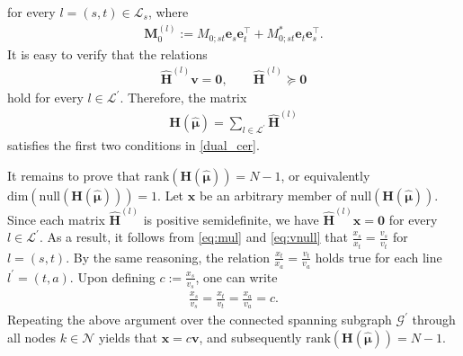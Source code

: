 \documentclass[journal,twoside]{IEEEtran}
\newcommand{\rank}{{\mathrm {rank}}}
\newcommand{\bv}{\mathbf{v}}
\newcommand{\bx}{\mathbf{x}}
\newcommand{\cL}{{\mathcal L}}
\newcommand{\cN}{{\mathcal N}}
\newcommand{\cT}{{\mathcal T}}
\begin{document}
for every $l=(s,t)\in\cL_s$, where
\begin{align}
\mathbf{M}^{(l)}_0:= M_{0;st} {\mathbf{e}}_s{\mathbf{e}}^{\top}_t + M_{0;st}^{*} {\mathbf{e}}_t{\mathbf{e}}^{\top}_s.
\end{align}
It is easy to verify that the relations
\begin{align}
\widehat{\mathbf{H}}^{(l)}\mathbf{v}= \mathbf{0},\qquad \widehat{\mathbf{H}}^{(l)}\succeq \mathbf{0}
\label{eq:vnull}
\end{align}
hold for every $l\in\cL^{\prime}$.
Therefore, the matrix
\begin{align}
\mathbf{H}(\hat{\boldsymbol{\mu}})= \sum_{l\in\cL^{\prime}} \widehat{\mathbf{H}}^{(l)}
\end{align}
 satisfies the first two conditions in \eqref{dual_cer}.

It remains to prove that $\rank(\mathbf{H}(\hat{\bm{\mu}})) = N-1$, or equivalently
$\mathrm{dim}(\mathrm{null}(\mathbf{H}(\hat{\bm{\mu}}))) = 1$. Let $\bx$ be an arbitrary member of $\mathrm{null}(\mathbf{H}(\hat{\bm{\mu}}))$. Since each matrix $\widehat{\mathbf{H}}^{(l)}$ is positive semidefinite, we have $\widehat{\mathbf{H}}^{(l)}\bx = \mathbf{0}$ for every $l\in\mathcal{L}^{\prime}$.
As a result, it follows from \eqref{eq:mul} and \eqref{eq:vnull} that $\frac{x_s}{x_t} = \frac{v_s}{v_t}$
for $l=(s,t)$.
By the same reasoning, the relation $\frac{x_t}{x_a} = \frac{v_t}{v_a}$ holds true for each line $l^{\prime} = (t,a)$.
Upon defining $c:=\frac{x_s}{v_s}$, one can write
\begin{align*}
\frac{x_s}{v_s} = \frac{x_t}{v_t} = \frac{x_a}{v_a} = c.
\end{align*}
Repeating the above argument over the connected spanning subgraph ${\mathcal G}^{\prime}$ through all nodes $k \in \cN$ yields that
$\bx = c\bv$, and subsequently $\rank(\mathbf{H}(\hat{\bm{\mu}})) = N-1$.
\end{document}

